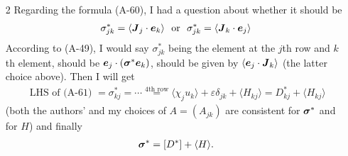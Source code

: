 \documentclass[amsa]{article}
\begin{document}
\begin{itemize}
  Denote by $\|\cdot\|_p$ the $L^p(\Tc\times\Vc)$--norm. Integration by
  parts and periodicity, the
  triangle inequality $|\langle h\rangle|\leq\langle|h|\rangle$, Young's inequality
  $\|(-\Delta)^{-1}\psi\|_p\leq C\|\psi\|_p$, and H{\"o}lder's   inequality
  $\|f\,g\|_1\leq\|f\|_{p_1}\,\|g\|_{q_1}$ with conjugate exponents 
  satisfying $(1/p_1)+(1/q_1)=1$ and $1\leq p_1,\,q_1\leq\infty$, yield equation
  (A-27):  
%
\begin{align}
  \|(-\Delta)^{-1}(\vecu\bcdot\bnabla) f\|^2_{1,2}
  &=|\langle \bnabla[(-\Delta)^{-1}(\vecu\bcdot\bnabla)f]\bcdot
      \bnabla[(-\Delta)^{-1}(\vecu\bcdot\bnabla)f]\rangle|
  \\\notag
  &=|\langle [(-\Delta)^{-1}(\vecu\bcdot\bnabla f)]
      \;(\vecu\bcdot\bnabla f)\rangle|
   ~\text{ (integration by parts)}
  \\\notag
  &\leq\langle |(-\Delta)^{-1}(\vecu\bcdot\bnabla f)|
      \;|\vecu\bcdot\bnabla f|\rangle
   ~\text{ (triangle inequality)}
  \\\notag
  &=\| |(-\Delta)^{-1}(\vecu\bcdot\bnabla f)|
      \;|\vecu\bcdot\bnabla f| \|_1
    ~\text{ (definition of } \|\cdot\|_1)
  \\\notag
  &\leq \| (-\Delta)^{-1}(\vecu\bcdot\bnabla f)\|_{p_1}\;
     \| \vecu\bcdot\bnabla f \|_{q_1}
     ~\text{ (H{\"o}lder's Inequality) }
  \\\notag   
  &\leq C\,\| \vecu\bcdot\bnabla f\|_{p_1}\;
     \| \vecu\bcdot\bnabla f \|_{q_1}
     ~\text{ (Young's Inequality) }
  \notag  
\end{align}
%

\textbf{In response to the remaining comments made in the second
  paragraph of item 1.}

As mentioned above, we have decided to defer our treatment of
general \emph{unbounded} flows to a future article, restricting our
results of the current manuscript to general \emph{bounded} flows.


  
%
\item[2]
Regarding the formula (A-60), I had a question about whether it should
be
%
\begin{align}
  \sigma_{jk}^*=\langle \boldsymbol{J}_j\cdot\boldsymbol{e}_k\rangle
  ~\text{ or }~
  \sigma_{jk}^*=\langle \boldsymbol{J}_k\cdot\boldsymbol{e}_j\rangle
\end{align}
%
According to (A-49), I would say $\sigma_{jk}^*$ being the element at the
$j$th row and $k$th element, should be $\boldsymbol{e}_j\cdot(\mbox{\boldmath${\sigma}$}^*\boldsymbol{e}_k)$,
should be given by $\langle\boldsymbol{e}_j\cdot\boldsymbol{J}_k\rangle$ (the latter choice
above). Then I will get 
%
\begin{align}
  \text{ LHS of (A-61) }
  =\sigma_{kj}^*
  =
  \cdots\stackrel{\text{4th row}}{=} \langle\chi_ju_k\rangle+\varepsilon\delta_{jk}+\langle H_{kj}\rangle
  =D^*_{kj}+\langle H_{kj}\rangle
\end{align}
%
(both the authors' and my choices of $A=(A_{jk})$ are consistent for
$\mbox{\boldmath${\sigma}$}^*$ and for $H$) and finally
%
\begin{align}
  \mbox{\boldmath${\sigma}$}^*=[D^*]+\langle H\rangle.  
\end{align}
%




\end{itemize}
\end{document}
